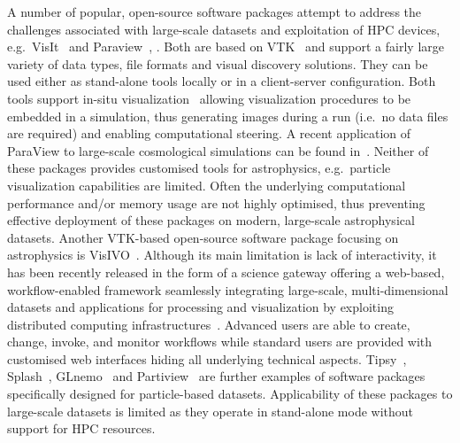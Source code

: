 \documentclass[smallextended]{svjour3}
\begin{document}
A number of popular, open-source software packages attempt to address the challenges associated with large-scale datasets and exploitation of HPC devices, e.g.\ VisIt~\cite{visit} and Paraview~\cite{paraview}, \cite{paraviewgrid}. Both are based on VTK~\cite{vtk} and support a fairly large variety of data types, file formats and visual discovery solutions. They can be used either as stand-alone tools locally or in a client-server configuration. Both tools support in-situ visualization~\cite{in-situ} allowing visualization procedures to be embedded in a simulation, thus generating images during a run (i.e.\ no data files are required) and enabling computational steering. A recent application of ParaView to large-scale cosmological simulations can be found in~\cite{2011ApJS..195...11W}. Neither of these packages provides customised tools for astrophysics, e.g.\ particle visualization capabilities are limited. Often the underlying computational performance and/or memory usage are not highly optimised, thus preventing effective deployment of these packages on modern, large-scale astrophysical datasets. Another VTK-based open-source software package focusing on astrophysics is VisIVO~\cite{visivo}. Although its main limitation is lack of interactivity, it has been recently released in the form of a science gateway offering a web-based, workflow-enabled framework seamlessly integrating large-scale, multi-dimensional datasets and applications for processing and visualization by exploiting distributed computing infrastructures~\cite{VisIVOGateway}. Advanced users are able to create, change, invoke, and monitor workflows while standard users are provided with customised web interfaces hiding all underlying technical aspects. Tipsy~\cite{tipsyurl}, Splash~\cite{splash}, GLnemo~\cite{glnemo} and Partiview~\cite{partiview} are further examples of software packages specifically designed for particle-based datasets. Applicability of these packages to large-scale datasets is limited as they operate in stand-alone mode without support for HPC resources.
\end{document}
